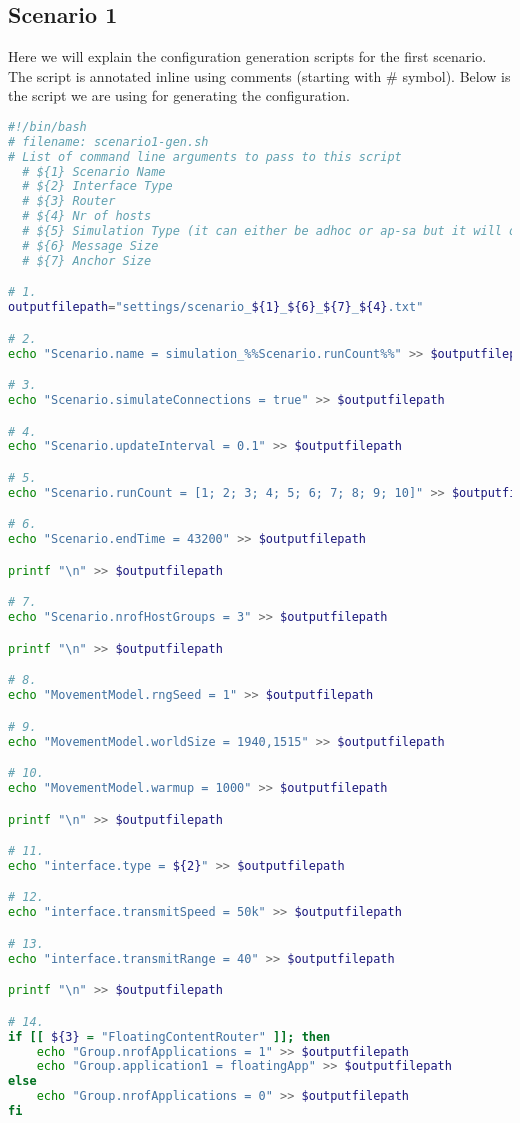 \subsection{Scenario 1}
Here we will explain the configuration generation scripts for the first scenario. The script is annotated inline using comments (starting with \# symbol). Below is the script we are using for generating the configuration.
\begin{lstlisting}[language=bash]
#!/bin/bash
# filename: scenario1-gen.sh
# List of command line arguments to pass to this script
  # ${1} Scenario Name
  # ${2} Interface Type
  # ${3} Router
  # ${4} Nr of hosts
  # ${5} Simulation Type (it can either be adhoc or ap-sa but it will only work if ${2} is WifiInterface)
  # ${6} Message Size
  # ${7} Anchor Size

# 1.
outputfilepath="settings/scenario_${1}_${6}_${7}_${4}.txt"

# 2.
echo "Scenario.name = simulation_%%Scenario.runCount%%" >> $outputfilepath

# 3.
echo "Scenario.simulateConnections = true" >> $outputfilepath

# 4.
echo "Scenario.updateInterval = 0.1" >> $outputfilepath

# 5.
echo "Scenario.runCount = [1; 2; 3; 4; 5; 6; 7; 8; 9; 10]" >> $outputfilepath

# 6.
echo "Scenario.endTime = 43200" >> $outputfilepath

printf "\n" >> $outputfilepath

# 7.
echo "Scenario.nrofHostGroups = 3" >> $outputfilepath

printf "\n" >> $outputfilepath

# 8.
echo "MovementModel.rngSeed = 1" >> $outputfilepath

# 9.
echo "MovementModel.worldSize = 1940,1515" >> $outputfilepath

# 10.
echo "MovementModel.warmup = 1000" >> $outputfilepath

printf "\n" >> $outputfilepath

# 11.
echo "interface.type = ${2}" >> $outputfilepath

# 12.
echo "interface.transmitSpeed = 50k" >> $outputfilepath

# 13.
echo "interface.transmitRange = 40" >> $outputfilepath

printf "\n" >> $outputfilepath

# 14.
if [[ ${3} = "FloatingContentRouter" ]]; then
	echo "Group.nrofApplications = 1" >> $outputfilepath
	echo "Group.application1 = floatingApp" >> $outputfilepath
else
	echo "Group.nrofApplications = 0" >> $outputfilepath
fi


\end{lstlisting}
